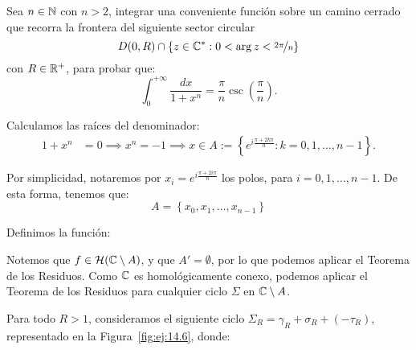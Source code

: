 \begin{ejercicio}\label{ej:14.6}
    Sea $n \in \mathbb{N}$ con $n > 2$, integrar una conveniente función sobre un camino cerrado que recorra la frontera del siguiente sector circular $$D(0,R) \cap \{z \in \mathbb{C}^* : 0 < \arg z < \nicefrac{2\pi}{n}\}$$
    con $R \in \mathbb{R}^+$, para probar que:
    \begin{equation*}
        \int_0^{+\infty} \frac{dx}{1 + x^n} = \frac{\pi}{n}\csc\left(\frac{\pi}{n}\right).
    \end{equation*}

    Calculamos las raíces del denominador:
    \begin{align*}
        1 + x^n &= 0 \implies x^n = -1 \implies x\in A:=\left\{e^{i\frac{\pi + 2k\pi}{n}} : k=0, 1, \ldots, n-1\right\}.
    \end{align*}

    Por simplicidad, notaremos por $x_i = e^{i\frac{\pi + 2i\pi}{n}}$ los polos, para $i=0, 1, \ldots, n-1$. De esta forma, tenemos que:
    \begin{equation*}
        A=\left\{x_0, x_1, \ldots, x_{n-1}\right\}
    \end{equation*}

    Definimos la función:

    Notemos que $f\in \mathcal{H}(\mathbb{C}\setminus A)$, y que $A'=\emptyset$, por lo que podemos aplicar el Teorema de los Residuos. Como $\mathbb{C}$ es homológicamente conexo, podemos aplicar el Teorema de los Residuos para cualquier ciclo $\Sigma$ en $\mathbb{C}\setminus A$.

    Para todo $R > 1$, consideramos el siguiente ciclo $\Sigma_R = \gamma_R + \sigma_R + (- \tau_R)$, representado en la Figura~\ref{fig:ej:14.6}, donde:
    \begin{figure}
        \centering
\end{figure}
\end{ejercicio}
